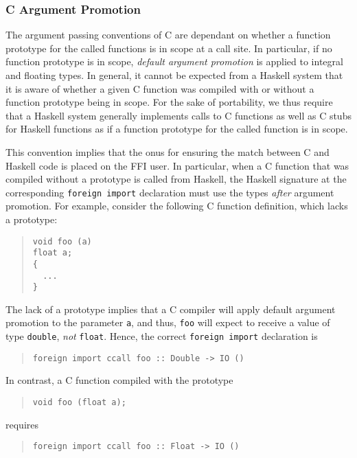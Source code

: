\documentclass[a4paper,twoside]{article}
\newcommand{\code}[1]{\texttt{#1}}      %
\begin{document}
\subsubsection{C Argument Promotion}

The argument passing conventions of C are dependant on whether a function
prototype for the called functions is in scope at a call site.  In particular,
if no function prototype is in scope, \emph{default argument promotion} is
applied to integral and floating types.  In general, it cannot be expected
from a Haskell system that it is aware of whether a given C function was
compiled with or without a function prototype being in scope.  For the sake of
portability, we thus require that a Haskell system generally implements calls
to C functions as well as C stubs for Haskell functions as if a function
prototype for the called function is in scope.

This convention implies that the onus for ensuring the match between C and
Haskell code is placed on the FFI user.  In particular, when a C function that
was compiled without a prototype is called from Haskell, the Haskell signature
at the corresponding \code{foreign import} declaration must use the types
\emph{after} argument promotion.  For example, consider the following C
function definition, which lacks a prototype:
%
\begin{quote}
\begin{verbatim}
void foo (a)
float a;
{
  ...
}
\end{verbatim}
\end{quote}
%
The lack of a prototype implies that a C compiler will apply default argument
promotion to the parameter \code{a}, and thus, \code{foo} will expect to
receive a value of type \code{double}, \emph{not} \code{float}.  Hence, the
correct \code{foreign import} declaration is
%
\begin{quote}
\begin{verbatim}
foreign import ccall foo :: Double -> IO ()
\end{verbatim}
\end{quote}

In contrast, a C function compiled with the prototype
%
\begin{quote}
\begin{verbatim}
void foo (float a);
\end{verbatim}
\end{quote}
%
requires
%
\begin{quote}
\begin{verbatim}
foreign import ccall foo :: Float -> IO ()
\end{verbatim}
\end{quote}
\end{document}

